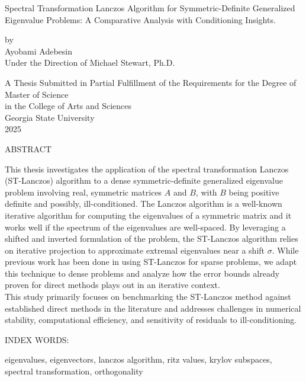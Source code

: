 \pagestyle{empty}
\begin{center}
Spectral Transformation Lanczos Algorithm for Symmetric-Definite Generalized Eigenvalue Problems: A Comparative Analysis with Conditioning Insights.

\vspace{.9in}
by\\
\vspace{.9in}
Ayobami Adebesin\\
\vspace{.9in}
Under the Direction of Michael Stewart, Ph.D. \\
\vspace{2in}

A Thesis Submitted in Partial Fulfillment of the Requirements for the Degree of\\  %
\vspace{.2in}
Master of Science \\
\vspace{.2in}
in the College of Arts and Sciences \\
\vspace{.2in}
Georgia State University \\
\vspace{.2in}
2025
\pagebreak 



ABSTRACT\\
\bigskip
\end{center}

\begin{flushleft}
	\justify
	This thesis investigates the application of the spectral transformation Lanczos (ST-Lanczos) algorithm to a dense symmetric-definite generalized eigenvalue problem involving real, symmetric matrices $A$ and $B$, with $B$ being positive definite and possibly, ill-conditioned. The Lanczos algorithm is a well-known iterative algorithm for computing the eigenvalues of a symmetric matrix and it works well if the spectrum of the eigenvalues are well-spaced. By leveraging a shifted and inverted formulation of the problem, the ST-Lanczos algorithm relies on iterative projection to approximate extremal eigenvalues near a shift $\sigma$. While previous work has been done in using ST-Lanczos for sparse problems, we adapt this technique to dense problems and analyze how the error bounds already proven for direct methods plays out in an iterative context.\\[10pt]
	This study primarily focuses on benchmarking the ST-Lanczos method against established direct methods in the literature and addresses challenges in numerical stability, computational efficiency, and sensitivity of residuals to ill-conditioning.
\end{flushleft} 
\begin{singlespace}
\vspace{0.5in}
\noindent INDEX WORDS:
\hspace{0.2in}
\parbox[t]{4.5in}{
eigenvalues, eigenvectors, lanczos algorithm, ritz values, krylov subspaces, spectral transformation, orthogonality}
\end{singlespace} 
